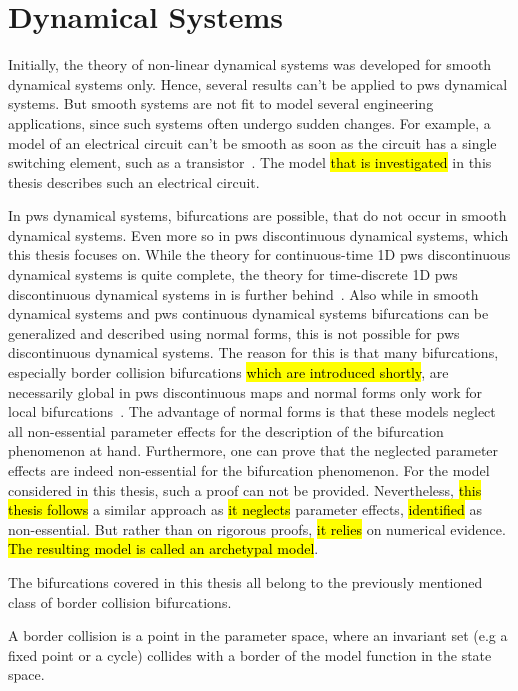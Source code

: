 \section{ Dynamical Systems}
\label{sec:state.pws}

Initially, the theory of non-linear dynamical systems was developed for smooth dynamical systems only.
Hence, several results can't be applied to \gls{pws} dynamical systems.
But smooth systems are not fit to model several engineering applications, since such systems often undergo sudden changes.
For example, a model of an electrical circuit can't be smooth as soon as the circuit has a single switching element, such as a transistor~\cite{ZhuMos03}.
The model \hl{that is investigated} in this thesis describes such an electrical circuit.

In \gls{pws} dynamical systems, bifurcations are possible, that do not occur in smooth dynamical systems.
Even more so in \gls{pws} discontinuous dynamical systems, which this thesis focuses on.
While the theory for continuous-time 1D \gls{pws} discontinuous dynamical systems is quite complete, the theory for time-discrete 1D \gls{pws} discontinuous dynamical systems in is further behind~\cite{Simpson16}.
Also while in smooth dynamical systems and \gls{pws} continuous dynamical systems bifurcations can be generalized and described using normal forms, this is not possible for \gls{pws} discontinuous dynamical systems.
The reason for this is that many bifurcations, especially border collision bifurcations \hl{which are introduced shortly}, are necessarily global in \gls{pws} discontinuous maps and normal forms only work for local bifurcations~\cite{avrutin2019continuous}.
The advantage of normal forms is that these models neglect all non-essential parameter effects for the description of the bifurcation phenomenon at hand.
Furthermore, one can prove that the neglected parameter effects are indeed non-essential for the bifurcation phenomenon.
For the model considered in this thesis, such a proof can not be provided.
Nevertheless, \hl{this thesis follows} a similar approach as \hl{it neglects} parameter effects, \hl{identified} as non-essential.
But rather than on rigorous proofs, \hl{it relies} on numerical evidence.
\hl{The resulting model is called an archetypal model}.

The bifurcations covered in this thesis all belong to the previously mentioned class of border collision bifurcations.

\begin{definition}
	A border collision is a point in the parameter space, where an invariant set (e.g a fixed point or a cycle) collides with a border of the model function in the state space.
\end{definition}

